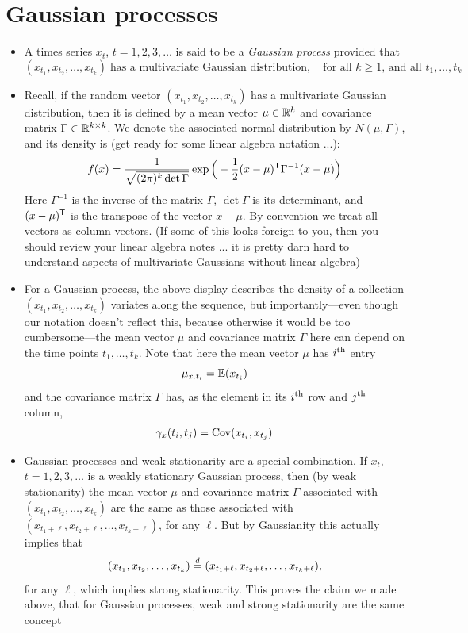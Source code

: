 \documentclass{article}
\begin{document}

\section{Gaussian processes}

\begin{itemize}
\item A times series $x_t$, $t = 1,2,3,\dots$ is said to be a \emph{Gaussian
    process} provided that  
  \[
  (x_{t_1}, x_{t_2}, \dots, x_{t_k}) \; \text{has a multivariate Gaussian
    distribution}, \quad \text{for all $k \geq 1$, and all $t_1,\dots,t_k$} 
  \]

\item Recall, if the random vector $(x_{t_1}, x_{t_2}, \dots, x_{t_k})$ has a 
  multivariate Gaussian distribution, then it is defined by a mean vector $\mu
  \in \mathbb{R}^k$ and covariance matrix $\Gamma \in \mathbb{R}^{k \times k}$. We denote the 
  associated normal distribution by $N(\mu, \Gamma)$, and its density is (get
  ready for some linear algebra notation ...):
  \[
  f(x) = \frac{1}{\sqrt{(2\pi)^k \det \Gamma}} \exp \Big( -
  \frac{1}{2} (x - \mu)^{\mathsf{T}} \Gamma^{-1} ( x - \mu ) \Big) 
  \]
  Here $\Gamma^{-1}$ is the inverse of the matrix $\Gamma$, $\det \Gamma$ is its
  determinant, and $(x-\mu)^{\mathsf{T}}$ is the transpose of the vector $x-\mu$.
  By convention we treat all vectors as column vectors. (If some of this looks
  foreign to you, then you should review your linear algebra notes ... it is
  pretty darn hard to understand aspects of multivariate Gaussians without 
  linear algebra) 

\item For a Gaussian process, the above display describes the density of a
  collection $(x_{t_1}, x_{t_2}, \dots, x_{t_k})$ variates along the sequence,
  but importantly---even though our notation doesn't reflect this, because
  otherwise it would be too cumbersome---the mean vector $\mu$ and covariance
  matrix $\Gamma$ here can depend on the time points $t_1,\dots,t_k$. Note that
  here the mean vector $\mu$ has $i^{\textnormal{th}}$ entry
  \[
  \mu_{x.t_i} = \mathbb{E}(x_{t_i})
  \]
  and the covariance matrix $\Gamma$ has, as the element in its $i^{\textnormal{th}}$ row and
  $j^{\textnormal{th}}$ column, 
  \[
  \gamma_x(t_i, t_j) = \operatorname{Cov}(x_{t_i}, x_{t_j})
  \]

\item Gaussian processes and weak stationarity are a special combination. If
  $x_t$, $t = 1,2,3,\dots$ is a weakly stationary Gaussian process, then (by
  weak stationarity) the mean vector $\mu$ and covariance matrix $\Gamma$
  associated with $(x_{t_1}, x_{t_2}, \dots, x_{t_k})$ are the same as those
  associated with $(x_{t_1+\ell}, x_{t_2+\ell}, \dots, x_{t_k+\ell})$, for any
  $\ell$. But by Gaussianity this actually implies that 
  \[
  (x_{t_1}, x_{t_2}, \dots, x_{t_k}) \overset{d}{=} (x_{t_1+\ell}, x_{t_2+\ell}, \dots,
  x_{t_k+\ell}),
  \]
  for any $\ell$, which implies strong stationarity. This proves the claim we
  made above, that for Gaussian processes, weak and strong stationarity are the
  same concept 
\end{itemize}
\end{document}
